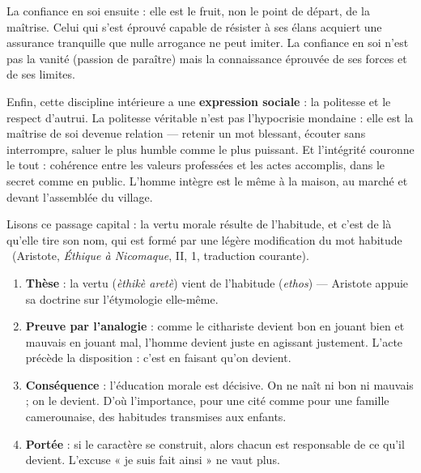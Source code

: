 \documentclass[11pt]{article}
\newcommand{\cle}[1]{{\popxbold\color{popdark}#1}}
\begin{document}
La \cle{confiance en soi} ensuite : elle est le fruit, non le point de départ, de la maîtrise. Celui qui s'est éprouvé capable de résister à ses élans acquiert une assurance tranquille que nulle arrogance ne peut imiter. La confiance en soi n'est pas la vanité (passion de paraître) mais la connaissance éprouvée de ses forces et de ses limites.

Enfin, cette discipline intérieure a une \textbf{expression sociale} : la \cle{politesse} et le respect d'autrui. La politesse véritable n'est pas l'hypocrisie mondaine : elle est la maîtrise de soi devenue relation — retenir un mot blessant, écouter sans interrompre, saluer le plus humble comme le plus puissant. Et l'\cle{intégrité} couronne le tout : cohérence entre les valeurs professées et les actes accomplis, dans le secret comme en public. L'homme intègre est le même à la maison, au marché et devant l'assemblée du village.

\begin{experience}
Lisons ce passage capital : \guillemotleft la vertu morale résulte de l'habitude, et c'est de là qu'elle tire son nom, qui est formé par une légère modification du mot habitude \guillemotright\ (Aristote, \emph{Éthique à Nicomaque}, II, 1, traduction courante).
\begin{enumerate}
\item \textbf{Thèse} : la vertu (\emph{èthikè aretè}) vient de l'habitude (\emph{ethos}) — Aristote appuie sa doctrine sur l'étymologie elle-même.
\item \textbf{Preuve par l'analogie} : comme le cithariste devient bon en jouant bien et mauvais en jouant mal, l'homme devient juste en agissant justement. L'acte précède la disposition : c'est en faisant qu'on devient.
\item \textbf{Conséquence} : l'éducation morale est décisive. On ne naît ni bon ni mauvais ; on le devient. D'où l'importance, pour une cité comme pour une famille camerounaise, des habitudes transmises aux enfants.
\item \textbf{Portée} : si le caractère se construit, alors chacun est responsable de ce qu'il devient. L'excuse « je suis fait ainsi » ne vaut plus.
\end{enumerate}
\end{experience}
\end{document}

